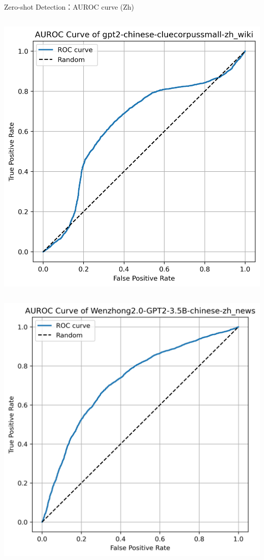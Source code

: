 \documentclass[serif]{beamer}
\begin{document}
\begin{frame}{Zero-shot Detection：AUROC curve (Zh)}
\begin{columns}[t]
    \centering
    \includegraphics[width=\linewidth]{images/gpt2-chinese-cluecorpussmall-zh_wiki.png}
\end{columns}
\vspace{0.3cm}
\begin{columns}[t]
    \centering
    \includegraphics[width=\linewidth]{images/Wenzhong2.0-GPT2-3.5B-chinese-zh_news.png}


\end{columns}
\end{frame}
\end{document}
